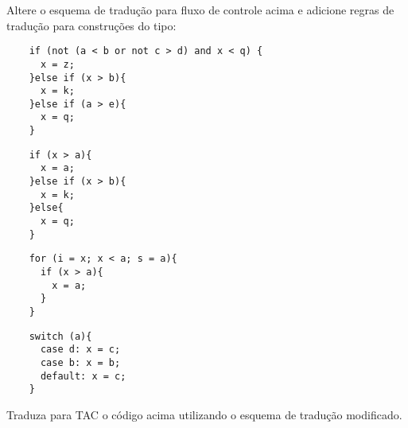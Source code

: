 \documentclass{compiladores}
\begin{document}
Altere o esquema de tradução para fluxo de controle acima e adicione
regras de tradução para construções do tipo:
\begin{listanumerada}
\item 
  \begin{lstlisting}
    if (not (a < b or not c > d) and x < q) {
      x = z;
    }else if (x > b){
      x = k;
    }else if (a > e){
      x = q;
    }
  \end{lstlisting}

\item
  \begin{lstlisting}
    if (x > a){
      x = a;
    }else if (x > b){
      x = k;
    }else{
      x = q;
    }
  \end{lstlisting}

\item 
  \begin{lstlisting}
    for (i = x; x < a; s = a){
      if (x > a){
        x = a;
      }
    }
  \end{lstlisting}

\item 
  \begin{lstlisting}
    switch (a){
      case d: x = c;
      case b: x = b;
      default: x = c;
    }
  \end{lstlisting}
\end{listanumerada}

Traduza para TAC o código acima utilizando o esquema de tradução modificado.
\end{document}
